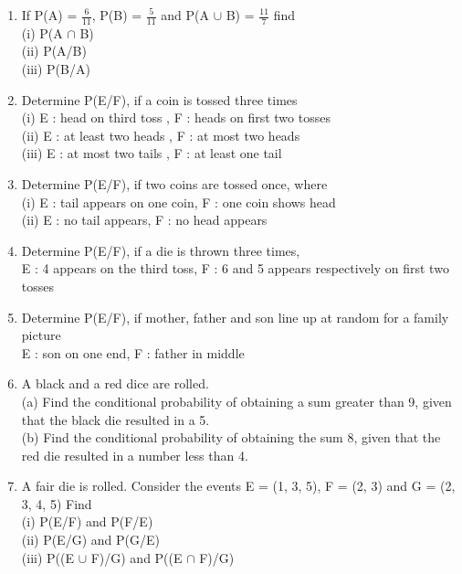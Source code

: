 \begin{enumerate}[label=\arabic*.,ref=\thesubsection.\theenumi]
\item If P(A) = $\frac{6}{11}$, P(B) = $\frac{5}{11}$ and P(A $\cup$ B) = $\frac{11}{7}$ find\\
(i) P(A $\cap$ B)\\ 
(ii) P(A/B)\\ 
(iii) P(B/A)\\

\item Determine P(E/F), if a coin is tossed three times\\
(i) E : head on third toss , F : heads on first two tosses\\
(ii) E : at least two heads , F : at most two heads\\
(iii) E : at most two tails , F : at least one tail\\

\item Determine P(E/F), if two coins are tossed once, where\\
(i) E : tail appears on one coin, F : one coin shows head\\
(ii) E : no tail appears, F : no head appears\\

\item Determine P(E/F), if a die is thrown three times,\\
E : 4 appears on the third toss, F : 6 and 5 appears respectively on first two tosses\\

\item Determine P(E/F), if mother, father and son line up at random for a family picture\\
E : son on one end, F : father in middle\\

\item A black and a red dice are rolled.\\
(a) Find the conditional probability of obtaining a sum greater than 9, given that the black die resulted in a 5.\\
(b) Find the conditional probability of obtaining the sum 8, given that the red die resulted in a number less than 4.\\
\solution


\item A fair die is rolled. Consider the events E =  (1, 3, 5), F = (2, 3) and G = (2, 3, 4, 5) Find\\
(i) P(E/F) and P(F/E) \\
(ii) P(E/G) and P(G/E)\\
(iii) P((E $\cup$ F)/G) and P((E $\cap$ F)/G)\\
\solution



\end{enumerate}

